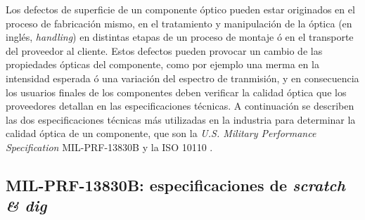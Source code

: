 \begin{figure}[H]
	\begin{floatrow}
	\end{floatrow}
\end{figure}

Los defectos de superficie de un componente óptico pueden estar originados en el proceso de fabricación mismo, en el tratamiento y manipulación de la óptica (en inglés, \textit{handling}) en distintas etapas de un proceso de montaje ó en el transporte del proveedor al cliente. Estos defectos pueden provocar un cambio de las propiedades ópticas del componente, como por ejemplo una merma en la intensidad esperada ó una variación del espectro de tranmisión, y en consecuencia los usuarios finales de los componentes deben verificar la calidad óptica que los proveedores detallan en las especificaciones técnicas. A continuación se describen las dos especificaciones técnicas más utilizadas en la industria para determinar la calidad óptica de un componente, que son la \textit{U.S. Military Performance Specification} MIL-PRF-13830B y la ISO 10110 \cite{milprf}\cite{iso10110}.

\singlespacing
\subsection*{MIL-PRF-13830B: especificaciones de \textit{scratch \& dig}}

